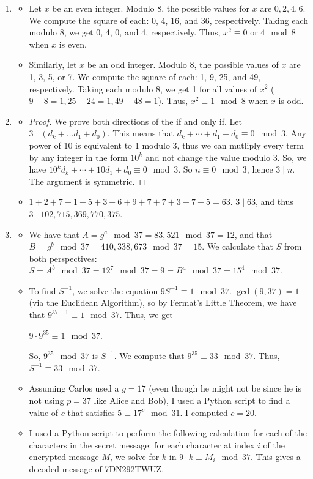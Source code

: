 \documentclass[12pt]{article}
\begin{document}
\begin{enumerate}[start = 1, label = {\bfseries Question \arabic*:}, leftmargin=1in]
\item\begin{itemize}
    \item[(a)] Let $x$ be an even integer. Modulo 8, the possible values for $x$ are $0,2,4,6$. We compute the square of each: 0, 4, 16, and 36, respectively. Taking each modulo 8, we get 0, 4, 0, and 4, respectively. Thus, $x^2 \equiv 0$ or $4 \mod 8$ when $x$ is even.
    \item[(b)] Similarly, let $x$ be an odd integer. Modulo 8, the possible values of $x$ are 1, 3, 5, or 7. We compute the square of each: 1, 9, 25, and 49, respectively. Taking each modulo 8, we get 1 for all values of $x^2$ ($9-8=1, 25-24=1, 49-48=1$). Thus, $x^2 \equiv 1 \mod 8$ when $x$ is odd.
\end{itemize}
\item \begin{itemize}
    \item[(a)] \begin{proof} We prove both directions of the if and only if.
        Let $3\mid (d_k + \ldots d_1 + d_0)$. This means that $d_k + \cdots + d_1 + d_0 \equiv 0 \mod{3}$. Any power of 10 is equivalent to 1 modulo 3, thus we can mutliply every term by any integer in the form $10^k$ and not change the value modulo 3. So, we have $10^k{d_k} + \cdots + 10d_1 + d_0 \equiv 0 \mod{3}$. So $n \equiv 0 \mod{3}$, hence $3\mid n$. The argument is symmetric.
    \end{proof}
    \item[(b)] $1+2+7+1+5+3+6+9+7+7+3+7+5 = 63$. $3\mid 63$, and thus $3\mid 102,715,369,770,375$.
\end{itemize}
\item\begin{itemize}
    \item[(a)] We have that $A=g^a \mod{37} = 83,521 \mod{37} = 12$, and that $B=g^b \mod{37} = 410,338,673 \mod{37}=15$. We calculate that $S$ from both perspectives: $S=A^b \mod{37}=12^7 \mod{37} = 9=B^a \mod{37}=15^4 \mod{37}$.
    \item[(b)] To find $S^{-1}$, we solve the equation $9S^{-1}\equiv 1 \mod{37}$. $\gcd(9,37)=1$ (via the Euclidean Algorithm), so by Fermat's Little Theorem, we have that $9^{37-1}\equiv 1 \mod{37}$. Thus, we get \begin{center}
        $9\cdot 9^{35}\equiv 1 \mod{37}$.
    \end{center} So, $9^{35} \mod{37}$ is $S^{-1}$. We compute that $9^{35} \equiv 33 \mod{37}$. Thus, $S^{-1} \equiv 33 \mod{37}$.
    \item[(c)] Assuming Carlos used a $g=17$ (even though he might not be since he is not using $p=37$ like Alice and Bob), I used a Python script to find a value of $c$ that satisfies $5\equiv 17^c \mod{31}$. I computed $c=20$.
    \item[(d)] I used a Python script to perform the following calculation for each of the characters in the secret message: for each character at index $i$ of the encrypted message $M$, we solve for $k$ in $9\cdot k \equiv M_i \mod{37}$. This gives a decoded message of 7DN292TWUZ.
\end{itemize}
\end{enumerate}
\end{document}

